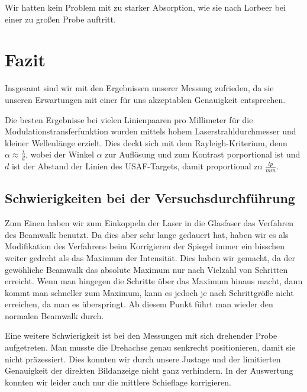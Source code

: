 Wir hatten kein Problem mit zu starker Absorption, wie sie nach Lorbeer \cite{slot_paper} bei einer zu großen Probe auftritt.

%

\section{Fazit}
Insgesamt sind wir mit den Ergebnissen unserer Messung zufrieden, da sie unseren Erwartungen mit einer für uns akzeptablen Genauigkeit entsprechen.

Die besten Ergebnisse bei vielen Linienpaaren pro Millimeter für die Modulationstransferfunktion wurden mittels hohem Laserstrahldurchmesser und kleiner Wellenlänge erzielt.
Dies deckt sich mit dem Rayleigh-Kriterium, denn $\alpha \approx \frac{\lambda}{d}$, wobei der Winkel $\alpha$ zur Auflösung und zum Kontrast porportional ist und $d$ ist der Abstand der Linien des USAF-Targets, damit proportional zu $\frac{lp}{mm} $.


\subsection{Schwierigkeiten bei der Versuchsdurchführung}
Zum Einen haben wir zum Einkoppeln der Laser in die Glasfaser das Verfahren des \glqq Beamwalk \grqq{} benutzt. Da dies aber sehr lange gedauert hat, haben wir es als Modifikation des Verfahrens beim Korrigieren der Spiegel immer ein bisschen weiter gedreht als das Maximum der Intensität.
Dies haben wir gemacht, da der gewöhliche \glqq Beamwalk \grqq{} das absolute Maximum nur nach Vielzahl von Schritten erreicht.
Wenn man hingegen die Schritte über das Maximum hinaus macht, dann kommt man schneller zum Maximum, kann es jedoch je nach Schrittgröße nicht erreichen, da man es überspringt.
Ab diesem Punkt führt man wieder den normalen Beamwalk durch.

Eine weitere Schwierigkeit ist bei den Messungen mit sich drehender Probe aufgetreten.
Man musste die Drehachse genau senkrecht positionieren, damit sie nicht präzessiert.
Dies konnten wir durch unsere Justage und der limitierten Genauigkeit der direkten Bildanzeige nicht ganz verhindern.
In der Auswertung konnten wir leider auch nur die mittlere Schieflage korrigieren.

